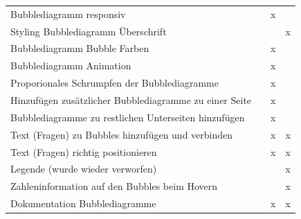\documentclass{mi-seminar}
\begin{document}
\begin{longtable}{p{5cm} | c | c | c}
Bubblediagramm responsiv & & x & \\
Styling Bubblediagramm Überschrift & & & x \\
Bubblediagramm Bubble Farben & & x & \\
Bubblediagramm Animation & & x & \\
Proporionales Schrumpfen der Bubblediagramme & & x & \\
Hinzufügen zusätzlicher Bubblediagramme zu einer Seite & & x & \\
Bubblediagramme zu restlichen Unterseiten hinzufügen & & x & \\
Text (Fragen) zu Bubbles hinzufügen und verbinden & & x & x \\
Text (Fragen) richtig positionieren & & x & x \\
Legende (wurde wieder verworfen) & & & x \\
Zahleninformation auf den Bubbles beim Hovern & & & x\\
Dokumentation Bubblediagramme & & x & x\\



\end{longtable}
\end{document}
